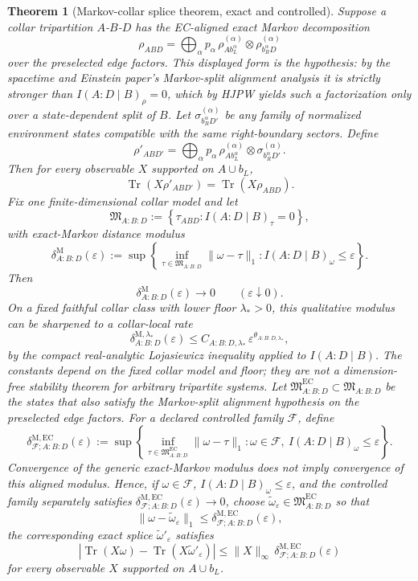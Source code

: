 \documentclass[11pt]{article}
\newtheorem{theorem}{Theorem}[section]
\theoremstyle{remark}
\theoremstyle{plain}
\begin{document}
\begin{theorem}[Markov-collar splice theorem, exact and controlled]\label{thm:splice}
Suppose a collar tripartition $A$-$B$-$D$ has the EC-aligned exact Markov decomposition
\[
\rho_{ABD}
=
\bigoplus_{\alpha}
p_\alpha\,
\rho^{(\alpha)}_{A b_L^\alpha}
\otimes
\rho^{(\alpha)}_{b_R^\alpha D}
\]
over the preselected edge factors. This displayed form is the hypothesis: by the spacetime and Einstein paper's Markov-split alignment analysis it is strictly stronger than \(I(A:D\mid B)_\rho=0\), which by HJPW yields such a factorization only over a state-dependent split of \(B\).
Let $\sigma_{b_R^\alpha D'}^{(\alpha)}$ be any family of normalized environment states compatible with the same right-boundary sectors. Define
\[
\rho'_{AB D'}
=
\bigoplus_{\alpha}
p_\alpha\,
\rho^{(\alpha)}_{A b_L^\alpha}
\otimes
\sigma_{b_R^\alpha D'}^{(\alpha)}.
\]
Then for every observable $X$ supported on $A\cup b_L$,
\[
\operatorname{Tr}(X\rho'_{AB D'})
=
\operatorname{Tr}(X\rho_{ABD}).
\]
Fix one finite-dimensional collar model and let
\[
\mathfrak M_{A:B:D}
:=
\left\{
\tau_{ABD}: I(A:D\mid B)_\tau=0
\right\},
\]
with exact-Markov distance modulus
\[
\delta^{\mathrm M}_{A:B:D}(\varepsilon)
:=
\sup\left\{
\inf_{\tau\in\mathfrak M_{A:B:D}}\|\omega-\tau\|_1:
I(A:D\mid B)_\omega\le\varepsilon
\right\}.
\]
Then
\[
\delta^{\mathrm M}_{A:B:D}(\varepsilon)\to0
\qquad
(\varepsilon\downarrow0).
\]
On a fixed faithful collar class with lower floor \(\lambda_\ast>0\), this
qualitative modulus can be sharpened to a collar-local rate
\[
\delta^{\mathrm M,\lambda_\ast}_{A:B:D}(\varepsilon)
\le
C_{A:B:D,\lambda_\ast}\,\varepsilon^{\theta_{A:B:D,\lambda_\ast}},
\]
by the compact real-analytic Lojasiewicz inequality applied to
\(I(A:D\mid B)\). The constants depend on the fixed collar model and floor;
they are not a dimension-free stability theorem for arbitrary tripartite
systems.
Let \(\mathfrak M^{\mathrm{EC}}_{A:B:D}\subset\mathfrak M_{A:B:D}\) be the
states that also satisfy the Markov-split alignment hypothesis on the
preselected edge factors. For a declared controlled family \(\mathcal F\), define
\[
\delta^{\mathrm{M,EC}}_{\mathcal F;A:B:D}(\varepsilon)
:=
\sup\left\{
\inf_{\tau\in\mathfrak M^{\mathrm{EC}}_{A:B:D}}\|\omega-\tau\|_1:
\omega\in\mathcal F,\ I(A:D\mid B)_\omega\le\varepsilon
\right\}.
\]
Convergence of the generic exact-Markov modulus does not imply convergence of
this aligned modulus. Hence, if \(\omega\in\mathcal F\),
\(I(A:D\mid B)_\omega\le \varepsilon\), and the controlled family separately
satisfies \(\delta^{\mathrm{M,EC}}_{\mathcal F;A:B:D}(\varepsilon)\to0\), choose
\(\widetilde\omega_\varepsilon\in\mathfrak M^{\mathrm{EC}}_{A:B:D}\) so that
\[
\|\omega-\widetilde\omega_\varepsilon\|_1
\le
\delta^{\mathrm{M,EC}}_{\mathcal F;A:B:D}(\varepsilon),
\]
the corresponding exact splice \(\widetilde\omega'_\varepsilon\) satisfies
\[
\left|
\operatorname{Tr}(X\omega)-\operatorname{Tr}(X\widetilde\omega'_\varepsilon)
\right|
\le
\|X\|_\infty\,
\delta^{\mathrm{M,EC}}_{\mathcal F;A:B:D}(\varepsilon)
\]
for every observable \(X\) supported on \(A\cup b_L\).


\end{theorem}
\end{document}
